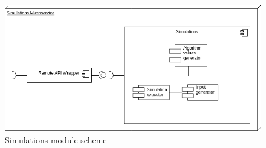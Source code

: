 \begin{figure}[ht]
    \includegraphics[width=\textwidth]{i_simulations.png}
    \centering
    \caption{Simulations module scheme}
    \label{fig:simulations-arch}
\end{figure}